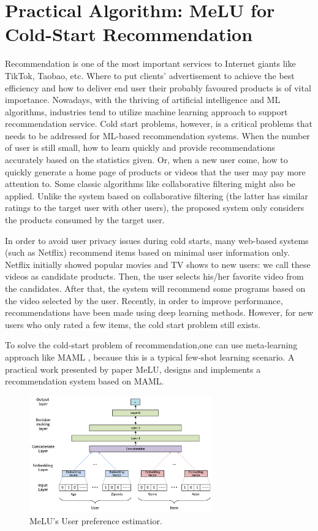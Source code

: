 \section{Practical Algorithm: MeLU for Cold-Start Recommendation}

Recommendation is one of the most important services to Internet giants like TikTok, Taobao, etc. Where to put clients' advertisement to achieve the best efficiency and how to deliver end user their probably favoured products is of vital importance. Nowadays, with the thriving of artificial intelligence and ML algorithms, industries tend to utilize machine learning approach to support recommendation service. Cold start problems, however, is a critical problems that needs to be addressed for ML-based recommendation systems. When the number of user is still small, how to learn quickly and  provide recommendations accurately based on the statistics given. Or, when a new user come, how to quickly generate a home page of products or videos that the user may pay more attention to. Some classic algorithms like collaborative filtering might also be applied. Unlike the system based on collaborative filtering (the latter has similar ratings to the target user with other users), the proposed system only considers the products consumed by the target user.

In order to avoid user privacy issues during cold starts, many web-based systems (such as Netflix) recommend items based on minimal user information only. Netflix initially showed popular movies and TV shows to new users: we call these videos as candidate products. Then, the user selects his/her favorite video from the candidates. After that, the system will recommend some programs based on the video selected by the user. Recently, in order to improve performance, recommendations have been made using deep learning methods. However, for new users who only rated a few items, the cold start problem still exists.

To solve the cold-start problem of recommendation\cite{Dong2020MAMOMM,Lu2020MetalearningOH,Liu2020AHG,Hansen2020ContentawareNH,Li2019FromZL,Zhang2020JointPM},one can use meta-learning approach like MAML , because this is a typical few-shot learning scenario. A practical work presented by paper MeLU\cite{lee2019melu}, designs and implements a recommendation system based on MAML. 

\begin{figure}[H] 
    \centering 
    \includegraphics[width=0.7\textwidth]{image/MeLU-arch.png} 
    \caption{MeLU's User preference estimatior.}
    \label{fig:melu-estimator} 
\end{figure}

